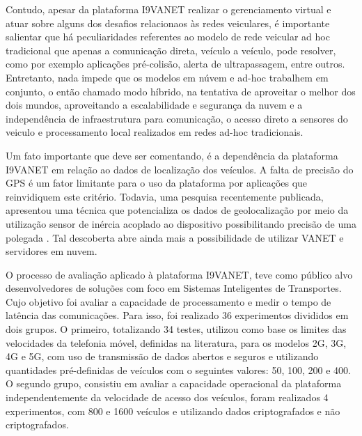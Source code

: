\documentclass[
	12pt,				%
	oneside,			%
	a4paper,			%
	english,			%
	brazil				%
	]{abntex2ppgsi}
\begin{document}
Contudo, apesar da plataforma I9VANET realizar o gerenciamento virtual e atuar sobre alguns dos desafios relacionaos às redes veiculares, é importante salientar que há peculiaridades referentes ao modelo de rede veicular ad hoc tradicional que apenas a comunicação direta, veículo a veículo, pode resolver, como por exemplo aplicações pré-colisão, alerta de ultrapassagem, entre outros. Entretanto, nada impede que os modelos em núvem e ad-hoc trabalhem em conjunto, o então chamado modo híbrido, na tentativa de aproveitar o melhor dos dois mundos, aproveitando a escalabilidade e segurança da nuvem e a independência de infraestrutura para comunicação, o acesso direto a sensores do veiculo e processamento local realizados em redes ad-hoc tradicionais. 

Um fato importante que deve ser comentando, é a dependência da plataforma I9VANET em relação ao dados de localização dos veículos. A falta de precisão do GPS é um fator limitante para o uso da plataforma por aplicações que reinvidiquem este critério. Todavia, uma pesquisa recentemente publicada, apresentou uma técnica que potencializa os dados de geolocalização por meio da utilização sensor de inércia acoplado ao dispositivo possibilitando precisão de uma polegada \cite{chen2016computationally}. Tal descoberta abre ainda mais a possibilidade de utilizar VANET e servidores em nuvem. 


O processo de avaliação aplicado à plataforma I9VANET, teve como público alvo desenvolvedores de soluções com foco em Sistemas Inteligentes de Transportes. Cujo objetivo foi avaliar a capacidade de processamento e medir o tempo de latência das comunicações. Para isso, foi realizado 36 experimentos divididos em dois  grupos. O primeiro, totalizando 34 testes, utilizou como base os limites das velocidades da telefonia móvel, definidas na literatura, para os modelos 2G, 3G, 4G e 5G, com uso de transmissão de dados abertos e seguros e utilizando quantidades pré-definidas de veículos com o seguintes valores: 50, 100, 200 e 400. O segundo grupo, consistiu em avaliar a capacidade operacional da plataforma independentemente da velocidade de acesso dos veículos, foram realizados 4 experimentos, com 800 e 1600 veículos e utilizando dados criptografados e não criptografados.
\end{document}
